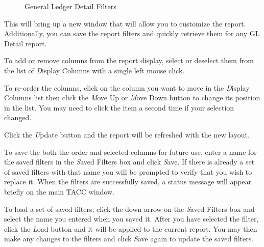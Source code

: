 \begin{figure}[hbtp]
\caption{ \label{fig:GeneralLedgerDetailFilters} General Ledger Detail Filters}
\end{figure}

This will bring up a new window that will allow you to customize the
report.  Additionally, you can save the report filters and quickly
retrieve them for any GL Detail report.

To add or remove columns from the report display, select or deselect
them from the list of {\emph Display Columns} with a single left mouse click.

To re-order the columns, click on the column you want to move in the
{\emph Display Columns} list then click the {\emph Move Up} or {\emph
Move Down} button to change its position in the list.  You may need to
click the item a second time if your selection changed.

Click the {\emph Update} button and the report will be refreshed with
the new layout.

To save the both the order and selected columns for future use, enter
a name for the saved filters in the {\emph Saved Filters} box and click
{\emph Save}.  If there is already a set of saved filters with that name you
will be prompted to verify that you wish to replace it.  When the
filters are successfully saved, a status message will appear briefly on
the main TACC window.

To load a set of saved filters, click the down arrow on the {\emph Saved
Filters} box and select the name you entered when you saved it.  After
you have selected the filter, click the {\emph Load} button and it will
be applied to the current report.  You may then make any changes to the
filters and click {\emph Save} again to update the saved filters.



